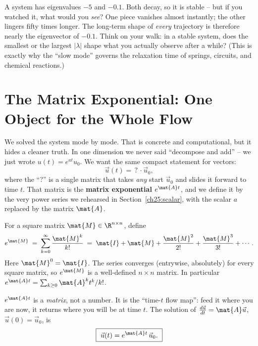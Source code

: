\begin{walkbox}
A system has eigenvalues $-5$ and $-0.1$. Both decay, so it is stable -- but if
you watched it, what would you \emph{see}? One piece vanishes almost instantly;
the other lingers fifty times longer. The long-term shape of \emph{every}
trajectory is therefore nearly the eigenvector of $-0.1$. Think on your walk: in a
stable system, does the smallest or the largest $|\lambda|$ shape what you actually
observe after a while? (This is exactly why the ``slow mode'' governs the
relaxation time of springs, circuits, and chemical reactions.)
\end{walkbox}

\section{The Matrix Exponential: One Object for the Whole Flow}
\label{ch25:matexp}

We solved the system mode by mode. That is concrete and computational, but it
hides a cleaner truth. In one dimension we never said ``decompose and add'' -- we
just wrote $u(t) = e^{at}u_0$. We want the same compact statement for vectors:
\[
  \vec{u}(t) = \,?\, \cdot \vec{u}_0,
\]
where the ``?'' is a single matrix that takes \emph{any} start $\vec{u}_0$ and
slides it forward to time $t$. That matrix is the \textbf{matrix exponential}
$e^{\mat{A}t}$, and we define it by the very power series we rehearsed in
Section~\ref{ch25:scalar}, with the scalar $a$ replaced by the matrix $\mat{A}$.

\begin{definition}
\label{ch25:def-matexp}
For a square matrix $\mat{M}\in\R^{n\times n}$, define
\[
  e^{\mat{M}}
  \;=\;
  \sum_{k=0}^{\infty}\frac{\mat{M}^k}{k!}
  \;=\;
  \mat{I} + \mat{M} + \frac{\mat{M}^2}{2!} + \frac{\mat{M}^3}{3!} + \cdots .
\]
Here $\mat{M}^0 = \mat{I}$. The series converges (entrywise, absolutely) for
every square matrix, so $e^{\mat{M}}$ is a well-defined $n\times n$ matrix. In
particular $e^{\mat{A}t} = \sum_{k\ge 0}\mat{A}^k t^k/k!$.
\end{definition}

\begin{focusbox}
$e^{\mat{A}t}$ is a \emph{matrix}, not a number. It is the ``time-$t$ flow
map'': feed it where you are now, it returns where you will be at time $t$. The
solution of $\frac{d\vec{u}}{dt}=\mat{A}\vec{u}$, $\vec{u}(0)=\vec{u}_0$, is
\[
  \boxed{\ \vec{u}(t) = e^{\mat{A}t}\,\vec{u}_0.\ }
\]
\end{focusbox}

